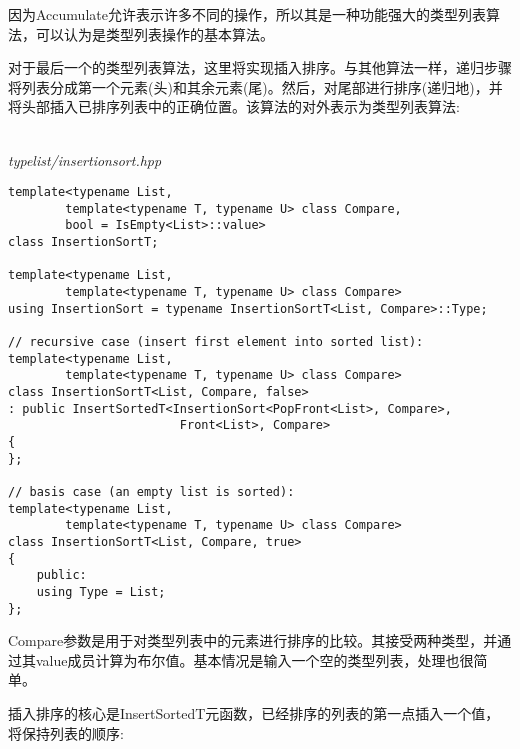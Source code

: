 因为Accumulate允许表示许多不同的操作，所以其是一种功能强大的类型列表算法，可以认为是类型列表操作的基本算法。


对于最后一个的类型列表算法，这里将实现插入排序。与其他算法一样，递归步骤将列表分成第一个元素(头)和其余元素(尾)。然后，对尾部进行排序(递归地)，并将头部插入已排序列表中的正确位置。该算法的对外表示为类型列表算法:

\hspace*{\fill} \\ %
\noindent
\textit{typelist/insertionsort.hpp}
\begin{lstlisting}[style=styleCXX]
template<typename List,
		template<typename T, typename U> class Compare,
		bool = IsEmpty<List>::value>
class InsertionSortT;

template<typename List,
		template<typename T, typename U> class Compare>
using InsertionSort = typename InsertionSortT<List, Compare>::Type;

// recursive case (insert first element into sorted list):
template<typename List,
		template<typename T, typename U> class Compare>
class InsertionSortT<List, Compare, false>
: public InsertSortedT<InsertionSort<PopFront<List>, Compare>,
						Front<List>, Compare>
{
};

// basis case (an empty list is sorted):
template<typename List,
		template<typename T, typename U> class Compare>
class InsertionSortT<List, Compare, true>
{
	public:
	using Type = List;
};
\end{lstlisting}

Compare参数是用于对类型列表中的元素进行排序的比较。其接受两种类型，并通过其value成员计算为布尔值。基本情况是输入一个空的类型列表，处理也很简单。

插入排序的核心是InsertSortedT元函数，已经排序的列表的第一点插入一个值，将保持列表的顺序:

